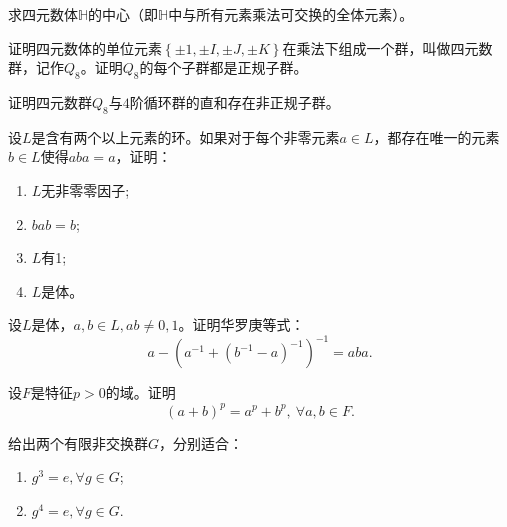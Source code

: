 \begin{prob}
求四元数体$\mathbb{H}$的中心（即$\mathbb{H}$中与所有元素乘法可交换的全体元素）。
\end{prob}

\begin{prob}
证明四元数体的单位元素$\left\{\pm 1,\pm I,\pm J,\pm K \right\}$在乘法下组成一个群，叫做{\heiti 四元数群}，记作$Q_{8}$。证明$Q_{8}$的每个子群都是正规子群。
\end{prob}

\begin{prob}
证明四元数群$Q_{8}$与$4$阶循环群的直和存在非正规子群。
\end{prob}

\begin{prob}
设$L$是含有两个以上元素的环。如果对于每个非零元素$a\in L$，都存在唯一的元素$b\in L$使得$aba=a$，证明：
\begin{enumerate}[$(1)$]
\item $L$无非零零因子;
\item $bab=b$;
\item $L$有1;
\item $L$是体。
\end{enumerate}
\end{prob}

\begin{prob}
设$L$是体，$a,b\in L,ab\neq 0,1$。证明{\heiti 华罗庚等式}：
\begin{equation*}
a-\left(a^{-1}+\left(b^{-1}-a\right)^{-1}\right)^{-1}=aba.
\end{equation*}
\end{prob}

\begin{prob}
设$F$是特征$p>0$的域。证明
\begin{equation*}
\left(a+b\right)^{p}=a^{p}+b^{p},\ \forall a,b\in F.
\end{equation*}
\end{prob}

\begin{prob}
给出两个有限非交换群$G$，分别适合：
\begin{enumerate}[$(1)$]
\item $g^{3}=e,\forall g\in G$;
\item $g^{4}=e,\forall g\in G$.
\end{enumerate}
\end{prob}
